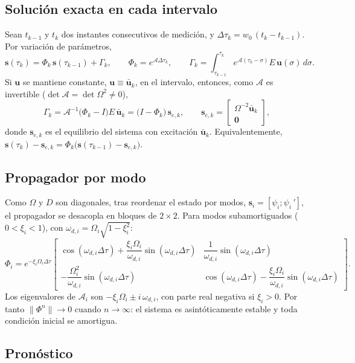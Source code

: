 \subsection{Solución exacta en cada intervalo}

Sean $t_{k-1}$ y $t_k$ dos instantes consecutivos de medición, y $\Delta\tau_k=w_0\,(t_k-t_{k-1})$. Por variación de parámetros,
\[
\mathbf s(\tau_k)=\Phi_k\,\mathbf s(\tau_{k-1})+\Gamma_k,\qquad
\Phi_k=e^{\mathcal A\Delta\tau_k},\qquad
\Gamma_k=\int_{\tau_{k-1}}^{\tau_k}e^{\mathcal A(\tau_k-\sigma)}E\,\mathbf u(\sigma)\,d\sigma .
\]
Si $\mathbf u$ se mantiene constante, $\mathbf u\equiv\bar{\mathbf u}_k$, en el intervalo, entonces, como $\mathcal A$ es invertible ($\det\mathcal A=\det\Omega^2\neq0$),
\[
\Gamma_k=\mathcal A^{-1}\big(\Phi_k-I\big)E\,\bar{\mathbf u}_k=\big(I-\Phi_k\big)\,\mathbf s_{e,k},\qquad
\mathbf s_{e,k}=\begin{bmatrix}\Omega^{-2}\bar{\mathbf u}_k\\ \mathbf 0\end{bmatrix},
\]
donde $\mathbf s_{e,k}$ es el equilibrio del sistema con excitación $\bar{\mathbf u}_k$. Equivalentemente, $\mathbf s(\tau_k)-\mathbf s_{e,k}=\Phi_k\big(\mathbf s(\tau_{k-1})-\mathbf s_{e,k}\big)$.

\subsection{Propagador por modo}

Como $\Omega$ y $D$ son diagonales, tras reordenar el estado por modos, $\mathbf s_i=[\psi_i;\psi_i\,']$, el propagador se desacopla en bloques de $2\times2$. Para modos subamortiguados ($0<\xi_i<1$), con $\omega_{d,i}=\Omega_i\sqrt{1-\xi_i^2}$:
\[
\Phi_i=e^{-\xi_i\Omega_i\Delta\tau}
\begin{bmatrix}
\cos(\omega_{d,i}\Delta\tau)+\dfrac{\xi_i\Omega_i}{\omega_{d,i}}\sin(\omega_{d,i}\Delta\tau)
&\dfrac{1}{\omega_{d,i}}\sin(\omega_{d,i}\Delta\tau)\\[10pt]
-\dfrac{\Omega_i^2}{\omega_{d,i}}\sin(\omega_{d,i}\Delta\tau)
&\cos(\omega_{d,i}\Delta\tau)-\dfrac{\xi_i\Omega_i}{\omega_{d,i}}\sin(\omega_{d,i}\Delta\tau)
\end{bmatrix}.
\]
Los eigenvalores de $\mathcal A_i$ son $-\xi_i\Omega_i\pm i\,\omega_{d,i}$, con parte real negativa si $\xi_i>0$. Por tanto $\|\Phi^n\|\to0$ cuando $n\to\infty$: el sistema es asintóticamente estable y toda condición inicial se amortigua.

\subsection{Pronóstico}

